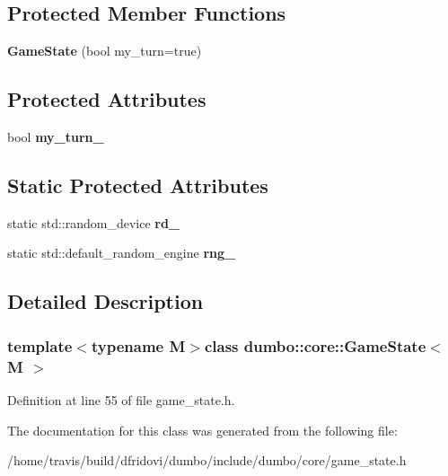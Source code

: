 \subsection*{Protected Member Functions}
\begin{DoxyCompactItemize}
\item 
\hypertarget{classdumbo_1_1core_1_1_game_state_a761603059309aba8469e98b9f6e517ec}{{\bfseries Game\-State} (bool my\-\_\-turn=true)}\label{classdumbo_1_1core_1_1_game_state_a761603059309aba8469e98b9f6e517ec}

\end{DoxyCompactItemize}
\subsection*{Protected Attributes}
\begin{DoxyCompactItemize}
\item 
\hypertarget{classdumbo_1_1core_1_1_game_state_af68aa1b2b5622077801b6fee2880828a}{bool {\bfseries my\-\_\-turn\-\_\-}}\label{classdumbo_1_1core_1_1_game_state_af68aa1b2b5622077801b6fee2880828a}

\end{DoxyCompactItemize}
\subsection*{Static Protected Attributes}
\begin{DoxyCompactItemize}
\item 
\hypertarget{classdumbo_1_1core_1_1_game_state_aafcc889dc70678e3a9840d1f8fd3805a}{static std\-::random\-\_\-device {\bfseries rd\-\_\-}}\label{classdumbo_1_1core_1_1_game_state_aafcc889dc70678e3a9840d1f8fd3805a}

\item 
\hypertarget{classdumbo_1_1core_1_1_game_state_a89930dde860d8e21e286106e2418609f}{static std\-::default\-\_\-random\-\_\-engine {\bfseries rng\-\_\-}}\label{classdumbo_1_1core_1_1_game_state_a89930dde860d8e21e286106e2418609f}

\end{DoxyCompactItemize}


\subsection{Detailed Description}
\subsubsection*{template$<$typename M$>$class dumbo\-::core\-::\-Game\-State$<$ M $>$}



Definition at line 55 of file game\-\_\-state.\-h.



The documentation for this class was generated from the following file\-:\begin{DoxyCompactItemize}
\item 
/home/travis/build/dfridovi/dumbo/include/dumbo/core/game\-\_\-state.\-h\end{DoxyCompactItemize}
